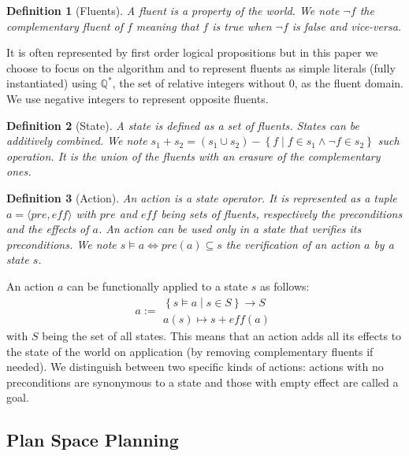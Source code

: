 \documentclass[]{article}
\newtheorem{definition}{Definition}
\begin{document}
\begin{definition}[Fluents]

A fluent is a property of the world. We note \(\lnot f\) the
complementary fluent of \(f\) meaning that \(f\) is true when
\(\lnot f\) is false and vice-versa.

\end{definition}

It is often represented by first order logical propositions but in this
paper we choose to focus on the algorithm and to represent fluents as
simple literals (fully instantiated) using \(\mathbb{Q}^*\), the set of
relative integers without \(0\), as the fluent domain. We use negative
integers to represent opposite fluents.

\begin{definition}[State]

A state is defined as a set of fluents. States can be additively
combined. We note
\(s_1 + s_2 = \left( s_1 \cup s_2 \right) - \left\{ f \middle| f \in s_1 \land \lnot f \in s_2 \right\}\)
such operation. It is the union of the fluents with an erasure of the
complementary ones.

\end{definition}

\begin{definition}[Action]

An action is a state operator. It is represented as a tuple
\(a = \langle pre, eff \rangle\) with \(pre\) and \(eff\) being sets of
fluents, respectively the preconditions and the effects of \(a\). An
action can be used only in a state that verifies its preconditions. We
note \(s \models a \Leftrightarrow pre(a) \subseteq s\) the verification
of an action \(a\) by a state \(s\).

\end{definition}

An action \(a\) can be functionally applied to a state \(s\) as follows:
\[a:= \substack{ \left\{ s \models a \middle| s \in S\right\} \to S\\
    a(s) \mapsto s + eff(a)}\] with \(S\) being the set of all states.
This means that an action adds all its effects to the state of the world
on application (by removing complementary fluents if needed). We
distinguish between two specific kinds of actions: actions with no
preconditions are synonymous to a state and those with empty effect are
called a goal.

\subsection{Plan Space Planning}\label{plan-space-planning}
\end{document}
